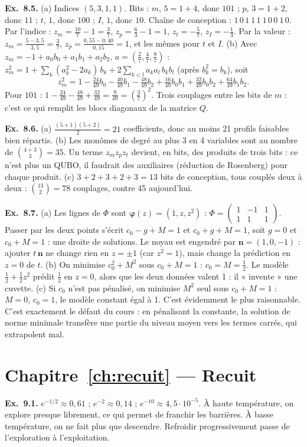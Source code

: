 \textbf{Ex.~8.5.} (a) Indices $(5,3,1,1)$. Bits : $m$, $5=1+4$, donc $101$ ; $p$, $3=1+2$, donc $11$ ; $t$, $1$, donc $100$ ; $I$, $1$, donc $10$. Chaîne de conception : $1\,0\,1\ 1\,1\ 1\,0\,0\ 1\,0$. Par l'indice : $z_m=\frac{10}7-1=\frac37$, $z_p=\frac63-1=1$, $z_t=-\frac57$, $z_I=-\frac13$. Par la valeur : $z_m=\frac{5-3{,}5}{3{,}5}=\frac37$, $z_p=\frac{0{,}55-0{,}40}{0{,}15}=1$, et les mêmes pour $t$ et $I$. (b) Avec $z_m=-1+a_0b_0+a_1b_1+a_2b_2$, $a=(\frac27,\frac47,\frac87)$ : $z_m^2=1+\sum_k(a_k^2-2a_k)\,b_k+2\sum_{k<l}a_ka_l\,b_kb_l$ (après $b_k^2=b_k$), soit
\[ z_m^2=1-\tfrac{24}{49}b_0-\tfrac{40}{49}b_1-\tfrac{48}{49}b_2+\tfrac{16}{49}b_0b_1+\tfrac{32}{49}b_0b_2+\tfrac{64}{49}b_1b_2. \]
Pour $101$ : $1-\frac{24}{49}-\frac{48}{49}+\frac{32}{49}=\frac{9}{49}=(\frac37)^2$. Trois couplages entre les bits de $m$ : c'est ce qui remplit les blocs diagonaux de la matrice $Q$.

\textbf{Ex.~8.6.} (a) $\frac{(5+1)(5+2)}2=21$ coefficients, donc au moins 21 profils faisables bien répartis. (b) Les monômes de degré au plus 3 en 4 variables sont au nombre de $\binom{4+3}3=35$. Un terme $z_mz_pz_t$ devient, en bits, des produits de trois bits : ce n'est plus un QUBO, il faudrait des auxiliaires (réduction de Rosenberg) pour chaque produit. (c) $3+2+3+2+3=13$ bits de conception, tous couplés deux à deux : $\binom{13}2=78$ couplages, contre 45 aujourd'hui.

\textbf{Ex.~8.7.} (a) Les lignes de $\Phi$ sont $\boldsymbol\varphi(z)=(1,z,z^2)$ : $\Phi=\begin{pmatrix}1&-1&1\\1&1&1\end{pmatrix}$. Passer par les deux points s'écrit $c_0-g+M=1$ et $c_0+g+M=1$, soit $g=0$ et $c_0+M=1$ : une droite de solutions. Le noyau est engendré par $\mathbf n=(1,0,-1)$ : ajouter $t\,\mathbf n$ ne change rien en $z=\pm1$ (car $z^2=1$), mais change la prédiction en $z=0$ de $t$. (b) On minimise $c_0^2+M^2$ sous $c_0+M=1$ : $c_0=M=\tfrac12$. Le modèle $\tfrac12+\tfrac12z^2$ prédit $\tfrac12$ en $z=0$, alors que les deux données valent 1 : il « invente » une cuvette. (c) Si $c_0$ n'est pas pénalisé, on minimise $M^2$ seul sous $c_0+M=1$ : $M=0$, $c_0=1$, le modèle constant égal à 1. C'est évidemment le plus raisonnable. C'est exactement le défaut du cours : en pénalisant la constante, la solution de norme minimale transfère une partie du niveau moyen vers les termes carrés, qui extrapolent mal.

\section*{Chapitre~\ref{ch:recuit} — Recuit}
\textbf{Ex.~9.1.} $e^{-1/2}\approx0{,}61$ ; $e^{-2}\approx0{,}14$ ; $e^{-10}\approx4{,}5\cdot10^{-5}$. À haute température, on explore presque librement, ce qui permet de franchir les barrières. À basse température, on ne fait plus que descendre. Refroidir progressivement passe de l'exploration à l'exploitation.

